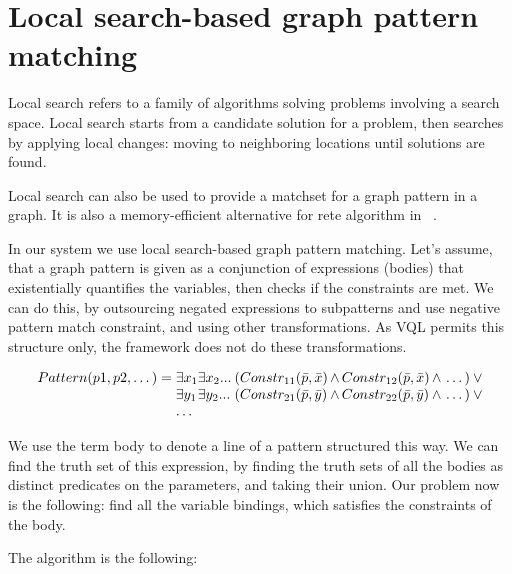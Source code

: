 \section{Local search-based graph pattern matching}


Local search refers to a family of algorithms solving problems involving a search space. 
Local search starts from a candidate solution for a problem, then searches by applying local changes: moving to neighboring locations until solutions are found.

Local search can also be used to provide a matchset for a graph pattern in a graph.
It is also a memory-efficient alternative for rete algorithm in \viatra{}~\cite{bur-marton-msc}.

In our system we use local search-based graph pattern matching. 
Let's assume, that a graph pattern is given as a conjunction of expressions (bodies) that existentially quantifies the variables, then checks if the constraints are met.
We can do this, by outsourcing negated expressions to subpatterns and use negative pattern match constraint, and using other transformations.
As VQL permits this structure only, the framework does not do these transformations.


\begin{equation}
\begin{array}{@{}r@{}l@{}l@{}l@{}l@{}l@{}}
Pattern(p1, p2, \dots) = \;
& \exists{x_1} & \exists{x_2}... \: & 
(Constr_{11}(\bar{p},\bar{x} ) & \, \wedge \, Constr_{12}(\bar{p},\bar{x} ) & \, \wedge \, \dots{}) \: \vee \\

& \exists{y_1} & \exists{y_2}... \: & 
(Constr_{21}(\bar{p},\bar{y} ) & \, \wedge \, Constr_{22}(\bar{p},\bar{y} ) & \, \wedge \, \dots{}) \: \vee \\
& \dots{}
\end{array}
\end{equation}

We use the term body to denote a line of a pattern structured this way.
We can find the truth set of this expression, by finding the truth sets of all the bodies as distinct predicates on the parameters, and taking their union.
Our problem now is the following: find all the variable bindings, which satisfies the constraints of the body.

The algorithm is the following:




